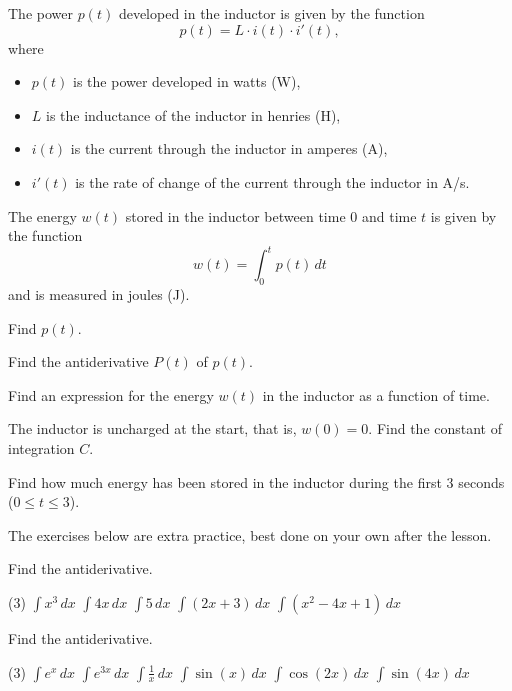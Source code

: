 The power $p(t)$ developed in the inductor is given by the function
\[
  p(t) = L \cdot i(t) \cdot i'(t),
\]
where
\begin{itemize}
  \item $p(t)$ is the power developed in watts (W),
  \item $L$ is the inductance of the inductor in henries (H),
  \item $i(t)$ is the current through the inductor in amperes (A),
  \item $i'(t)$ is the rate of change of the current through the inductor in A/s.
\end{itemize}
The energy $w(t)$ stored in the inductor between time $0$ and time $t$ is given by the function
\[
  w(t) = \int_0^t p(t)\,dt
\]
and is measured in joules (J).
\begin{parts}
  \item Find $p(t)$.
  \item Find the antiderivative $P(t)$ of $p(t)$.
  \item Find an expression for the energy $w(t)$ in the inductor as a function of time.
  \item The inductor is uncharged at the start, that is, $w(0) = 0$. Find the constant of
    integration $C$.
  \item Find how much energy has been stored in the inductor during the first $3$ seconds
    (${0 \leq t \leq 3}$).
\end{parts}

The exercises below are extra practice, best done on your own after the lesson.

Find the antiderivative.
\begin{delar}(3)
  \task $\displaystyle\int x^3\,dx$
  \task $\displaystyle\int 4x\,dx$
  \task $\displaystyle\int 5\,dx$
  \task $\displaystyle\int (2x + 3)\,dx$
  \task $\displaystyle\int (x^2 - 4x + 1)\,dx$
\end{delar}

Find the antiderivative.
\begin{delar}(3)
  \task $\displaystyle\int e^x\,dx$
  \task $\displaystyle\int e^{3x}\,dx$
  \task $\displaystyle\int \frac{1}{x}\,dx$
  \task $\displaystyle\int \sin(x)\,dx$
  \task $\displaystyle\int \cos(2x)\,dx$
  \task $\displaystyle\int \sin(4x)\,dx$
\end{delar}

